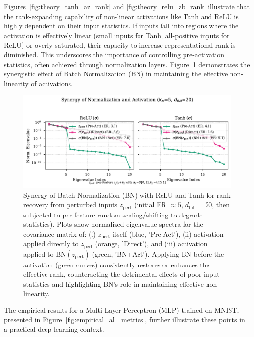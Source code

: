 \documentclass{article}
\begin{document}
Figures~\ref{fig:theory_tanh_az_rank} and \ref{fig:theory_relu_zb_rank} illustrate that the rank-expanding capability of non-linear activations like Tanh and ReLU is highly dependent on their input statistics. If inputs fall into regions where the activation is effectively linear (small inputs for Tanh, all-positive inputs for ReLU) or overly saturated, their capacity to increase representational rank is diminished. This underscores the importance of controlling pre-activation statistics, often achieved through normalization layers. Figure~\ref{fig:theory_joint_norm_activation_rank} demonstrates the synergistic effect of Batch Normalization (BN) in maintaining the effective non-linearity of activations.

\begin{figure}[ht!]
    \centering
    \includegraphics[width=0.7\linewidth]{theory_joint_norm_activation_rank.pdf} 
    \caption{Synergy of Batch Normalization (BN) with ReLU and Tanh for rank recovery from perturbed inputs $z_{\text{pert}}$ (initial ER $\approx 5$, $d_{\text{full}}=20$, then subjected to per-feature random scaling/shifting to degrade statistics). Plots show normalized eigenvalue spectra for the covariance matrix of: (i) $z_{\text{pert}}$ itself (blue, 'Pre-Act'), (ii) activation applied directly to $z_{\text{pert}}$ (orange, 'Direct'), and (iii) activation applied to $\text{BN}(z_{\text{pert}})$ (green, 'BN+Act'). Applying BN before the activation (green curves) consistently restores or enhances the effective rank, counteracting the detrimental effects of poor input statistics and highlighting BN's role in maintaining effective non-linearity.}
    \label{fig:theory_joint_norm_activation_rank}
\end{figure}

The empirical results for a Multi-Layer Perceptron (MLP) trained on MNIST, presented in Figure~\ref{fig:empirical_all_metrics}, further illustrate these points in a practical deep learning context.
\end{document}

